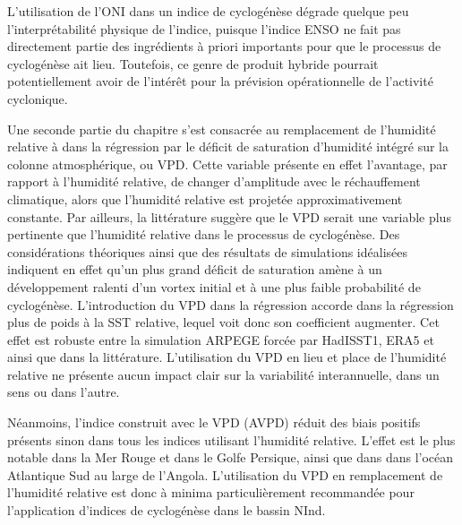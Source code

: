 \documentclass[../main.tex]{subfiles}
\begin{document}
L'utilisation de l'ONI dans un indice de cyclogénèse dégrade quelque peu l'interprétabilité physique de l'indice, puisque l'indice ENSO ne fait pas directement
partie des ingrédients à priori importants pour que le processus de cyclogénèse ait lieu. Toutefois, ce genre de produit hybride pourrait potentiellement avoir
de l'intérêt pour la prévision opérationnelle de l'activité cyclonique.

Une seconde partie du chapitre s'est consacrée au remplacement de l'humidité relative à  dans la régression par le déficit de saturation d'humidité
intégré sur la colonne atmosphérique, ou VPD. Cette variable présente en effet l'avantage, par rapport à l'humidité relative, de changer d'amplitude avec le
réchauffement climatique, alors que l'humidité relative est projetée approximativement constante. Par ailleurs, la littérature suggère que le VPD serait une
variable plus pertinente que l'humidité relative dans le processus de cyclogénèse. Des considérations théoriques
\parencite{emanuel_finiteamplitude_1989,emanuel_sensitivity_1995,emanuel_hurricanes_2008} ainsi que des résultats de simulations idéalisées
\parencite{rappin_thermodynamic_2010} indiquent en effet qu'un plus grand déficit de saturation amène à un développement ralenti d'un vortex initial et à une
plus faible probabilité de cyclogénèse. L'introduction du VPD dans la régression accorde dans la régression plus de poids à la SST relative, lequel voit donc
son coefficient augmenter. Cet effet est robuste entre la simulation ARPEGE forcée par HadISST1, ERA5 et ainsi que dans la littérature. L'utilisation du VPD en
lieu et place de l'humidité relative ne présente aucun impact clair sur la variabilité interannuelle, dans un sens ou dans l'autre.

Néanmoins, l'indice construit avec le VPD (AVPD) réduit des biais positifs présents sinon dans tous les indices utilisant l'humidité relative. L'effet est le
plus notable dans la Mer Rouge et dans le Golfe Persique, ainsi que dans dans l'océan Atlantique Sud au large de l'Angola. L'utilisation du VPD en remplacement
de l'humidité relative est donc à minima particulièrement recommandée pour l'application d'indices de cyclogénèse dans le bassin NInd.
\end{document}
